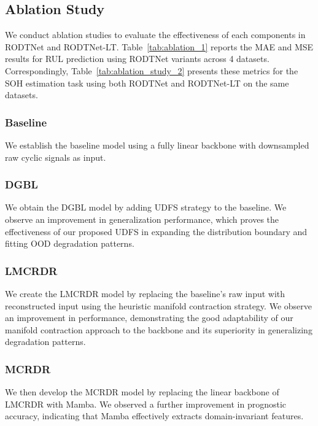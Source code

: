 \documentclass[lettersize,journal]{IEEEtran}
\begin{document}
\subsection{Ablation Study}

We conduct ablation studies to evaluate the effectiveness of each components in RODTNet and RODTNet-LT. Table~\ref{tab:ablation_1} reports the MAE and MSE results for RUL prediction using RODTNet variants across 4 datasets. Correspondingly, Table~\ref{tab:ablation_study_2} presents these metrics for the SOH estimation task using both RODTNet and RODTNet-LT on the same datasets.

\subsubsection{Baseline}

We establish the baseline model using a fully linear backbone with downsampled raw cyclic signals as input.

\subsubsection{DGBL}

We obtain the DGBL model by adding UDFS strategy to the baseline. We observe an improvement in generalization performance, which proves the effectiveness of our proposed UDFS in expanding the distribution boundary and fitting OOD degradation patterns.

\subsubsection{LMCRDR}

We create the LMCRDR model by replacing the baseline's raw input with reconstructed input using the heuristic manifold contraction strategy. We observe an improvement in performance, demonstrating the good adaptability of our manifold contraction approach to the backbone and its superiority in generalizing degradation patterns.

\subsubsection{MCRDR}

We then develop the MCRDR model by replacing the linear backbone of LMCRDR with Mamba. We observed a further improvement in prognostic accuracy, indicating that Mamba effectively extracts domain-invariant features.
\end{document}
